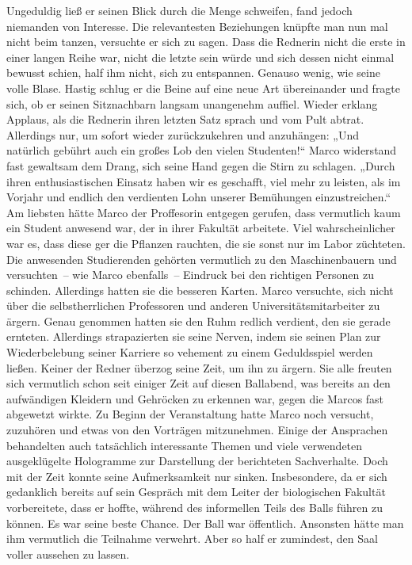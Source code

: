 Ungeduldig ließ er seinen Blick durch die Menge schweifen, fand jedoch niemanden von Interesse. Die relevantesten Beziehungen knüpfte man nun mal nicht beim tanzen, versuchte er sich zu sagen. Dass die Rednerin nicht die erste in einer langen Reihe war, nicht die letzte sein würde und sich dessen nicht einmal bewusst schien, half ihm nicht, sich zu entspannen. Genauso wenig, wie seine volle Blase. Hastig schlug er die Beine auf eine neue Art übereinander und fragte sich, ob er seinen Sitznachbarn langsam unangenehm auffiel.
Wieder erklang Applaus, als die Rednerin ihren letzten Satz sprach und vom Pult abtrat. Allerdings nur, um sofort wieder zurückzukehren und anzuhängen: „Und natürlich gebührt auch ein großes Lob den vielen Studenten!“ Marco widerstand fast gewaltsam dem Drang, sich seine Hand gegen die Stirn zu schlagen. „Durch ihren enthusiastischen Einsatz haben wir es geschafft, viel mehr zu leisten, als im Vorjahr und endlich den verdienten Lohn unserer Bemühungen einzustreichen.“
Am liebsten hätte Marco der Proffesorin entgegen gerufen, dass vermutlich kaum ein Student anwesend war, der in ihrer Fakultät arbeitete. Viel wahrscheinlicher war es, dass diese ger die Pflanzen rauchten, die sie sonst nur im Labor züchteten.
Die anwesenden Studierenden gehörten vermutlich zu den Maschinenbauern und versuchten – wie Marco ebenfalls – Eindruck bei den richtigen Personen zu schinden. Allerdings hatten sie die besseren Karten.
Marco versuchte, sich nicht über die selbstherrlichen Professoren und anderen Universitätsmitarbeiter zu ärgern. Genau genommen hatten sie den Ruhm redlich verdient, den sie gerade ernteten. Allerdings strapazierten sie seine Nerven, indem sie seinen Plan zur Wiederbelebung seiner Karriere so vehement zu einem Geduldsspiel werden ließen.
Keiner der Redner überzog seine Zeit, um ihn zu ärgern. Sie alle freuten sich vermutlich schon seit einiger Zeit auf diesen Ballabend, was bereits an den aufwändigen Kleidern und Gehröcken zu erkennen war, gegen die Marcos fast abgewetzt wirkte.
Zu Beginn der Veranstaltung hatte Marco noch versucht, zuzuhören und etwas von den Vorträgen mitzunehmen. Einige der Ansprachen behandelten auch tatsächlich interessante Themen und viele verwendeten ausgeklügelte Hologramme zur Darstellung der berichteten Sachverhalte. Doch mit der Zeit konnte seine Aufmerksamkeit nur sinken. Insbesondere, da er sich gedanklich bereits auf sein Gespräch mit dem Leiter der biologischen Fakultät vorbereitete, dass er hoffte, während des informellen Teils des Balls führen zu können.
Es war seine beste Chance. Der Ball war öffentlich. Ansonsten hätte man ihm vermutlich die Teilnahme verwehrt. Aber so half er zumindest, den Saal voller aussehen zu lassen.
